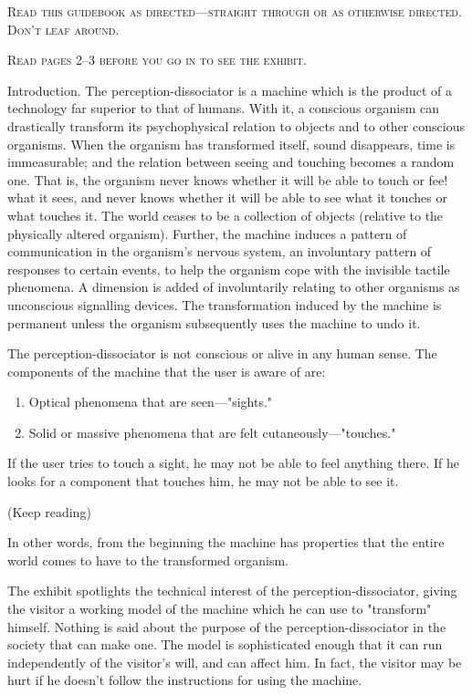 \documentclass[10pt,twoside,draft]{memoir}
\begin{document}
{{\textsc{Read this guidebook as directed---straight through or as otherwise directed. Don't leaf around.}


\textsc{Read pages 2--3 before you go in to see the exhibit.}

\clearpage

Introduction. The perception-dissociator is a machine which is the 
product of a technology far superior to that of humans. With it, a conscious 
organism can drastically transform its psychophysical relation to objects and 
to other conscious organisms. When the organism has transformed itself, 
sound disappears, time is immeasurable; and the relation between seeing and 
touching becomes a random one. That is, the organism never knows whether 
it will be able to touch or fee! what it sees, and never knows whether it will 
be able to see what it touches or what touches it. The world ceases to be a 
collection of objects (relative to the physically altered organism). Further, 
the machine induces a pattern of communication in the organism's nervous 
system, an involuntary pattern of responses to certain events, to help the 
organism cope with the invisible tactile phenomena. A dimension is added of 
involuntarily relating to other organisms as unconscious signalling devices. 
The transformation induced by the machine is permanent unless the 
organism subsequently uses the machine to undo it. 


The perception-dissociator is not conscious or alive in any human sense. 
The components of the machine that the user is aware of are: 
\begin{enumerate}
	\item Optical phenomena that are seen---"sights." 
	\item Solid or massive phenomena that are felt cutaneously---"touches." 
\end{enumerate}
If the user tries to touch a sight, he may not be 
able to feel anything there. If he looks for a component that touches him, he 
may not be able to see it. 


(Keep reading) 

\clearpage

In other words, from the beginning the machine has properties that the 
entire world comes to have to the transformed organism. 

The exhibit spotlights the technical interest of the 
perception-dissociator, giving the visitor a working model of the machine 
which he can use to "transform" himself. Nothing is said about the purpose 
of the perception-dissociator in the society that can make one. The model is 
sophisticated enough that it can run independently of the visitor's will, and 
can affect him. In fact, the visitor may be hurt if he doesn't follow the 
instructions for using the machine. 


}}
\end{document}
